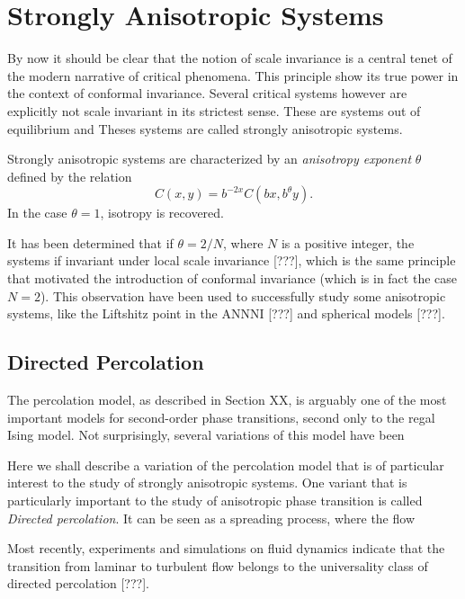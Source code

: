 \section{Strongly Anisotropic Systems}
\label{ch:anis}

By now it should be clear that the notion of scale invariance is a central
tenet of the modern narrative of critical phenomena. This principle show its
true power in the context of conformal invariance. Several critical systems
however are explicitly not scale invariant in its strictest sense. These are
systems out of equilibrium and Theses systems are called strongly anisotropic
systems.

Strongly anisotropic systems are characterized by an \textit{anisotropy
exponent} $\theta$ defined by the relation
\begin{equation}
    C(x, y) = b^{-2x}C(bx, b^\theta y).
\end{equation}
In the case $\theta=1$, isotropy is recovered.

It has been determined that if $\theta = 2/N$, where $N$ is a positive integer,
the systems if invariant under local scale invariance [???], which is the same
principle that motivated the introduction of conformal invariance (which is in
fact the case $N=2$). This observation have been used to successfully study
some anisotropic systems, like the Liftshitz point in the ANNNI [???] and
spherical models [???].


\subsection{Directed Percolation}
\label{sec:dp}

The percolation model, as described in Section XX, is arguably one of the most
important models for second-order phase transitions, second only to the regal
Ising model. Not surprisingly, several variations of this model have been

Here we shall describe a variation of the percolation model that is of
particular interest to the study of strongly anisotropic systems. One variant
that is particularly important to the study of anisotropic phase transition is
called \textit{Directed percolation}. It can be seen as a spreading process,
where the flow 

Most recently, experiments and simulations on fluid dynamics indicate
that the transition from laminar to turbulent flow belongs to the
universality class of directed percolation [???].

